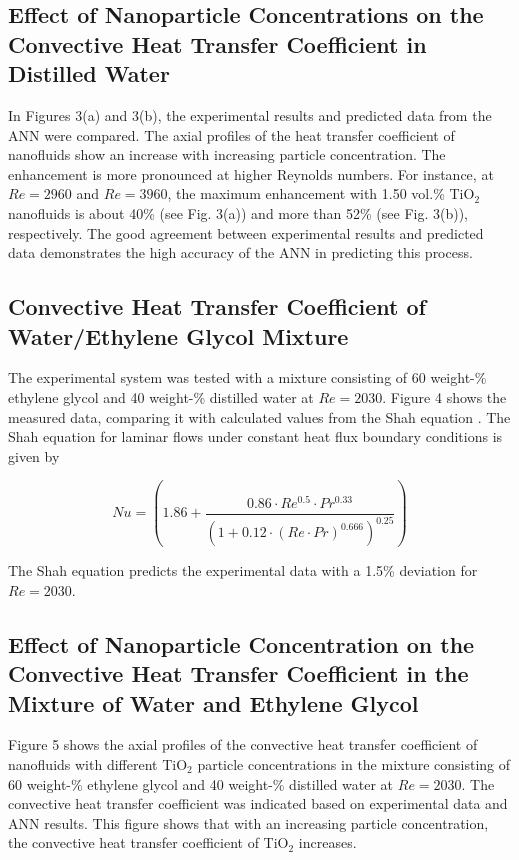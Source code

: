 \documentclass{article}
\begin{document}
\subsection{Effect of Nanoparticle Concentrations on the Convective Heat Transfer Coefficient in Distilled Water}

In Figures 3(a) and 3(b), the experimental results and predicted data from the ANN were compared. The axial profiles of the heat transfer coefficient of nanofluids show an increase with increasing particle concentration. The enhancement is more pronounced at higher Reynolds numbers. For instance, at $Re = 2960$ and $Re = 3960$, the maximum enhancement with 1.50 vol.\% TiO$_2$ nanofluids is about 40\% (see Fig. 3(a)) and more than 52\% (see Fig. 3(b)), respectively. The good agreement between experimental results and predicted data demonstrates the high accuracy of the ANN in predicting this process.

\subsection{Convective Heat Transfer Coefficient of Water/Ethylene Glycol Mixture}

The experimental system was tested with a mixture consisting of 60 weight-\% ethylene glycol and 40 weight-\% distilled water at $Re = 2030$. Figure 4 shows the measured data, comparing it with calculated values from the Shah equation \cite{ref10}. The Shah equation for laminar flows under constant heat flux boundary conditions is given by 

\begin{equation}
Nu = \left(1.86 + \frac{0.86 \cdot Re^{0.5} \cdot Pr^{0.33}}{\left(1 + 0.12 \cdot (Re \cdot Pr)^{0.666}\right)^{0.25}}\right)
\label{eq:shah}
\end{equation}

The Shah equation predicts the experimental data with a 1.5\% deviation for $Re = 2030$.

\subsection{Effect of Nanoparticle Concentration on the Convective Heat Transfer Coefficient in the Mixture of Water and Ethylene Glycol}

Figure 5 shows the axial profiles of the convective heat transfer coefficient of nanofluids with different TiO$_2$ particle concentrations in the mixture consisting of 60 weight-\% ethylene glycol and 40 weight-\% distilled water at $Re = 2030$. The convective heat transfer coefficient was indicated based on experimental data and ANN results. This figure shows that with an increasing particle concentration, the convective heat transfer coefficient of TiO$_2$ increases.
\end{document}
